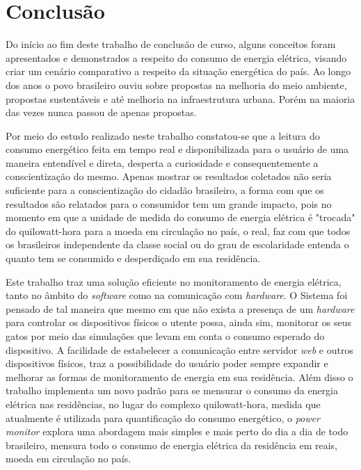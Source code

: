 \chapter[Conclusão]{Conclusão}
\label{ch:conclusao-cap}

Do início ao fim deste trabalho de conclusão de curso, alguns conceitos foram apresentados
e demonstrados a respeito do consumo de energia elétrica, visando criar um cenário
comparativo a respeito da situação energética do país. Ao longo dos anos o povo brasileiro
ouviu sobre propostas na melhoria do meio ambiente, propostas sustentáveis e até
melhoria na infraestrutura urbana. Porém na maioria das vezes nunca passou de apenas propostas.

Por meio do estudo realizado neste trabalho constatou-se que a leitura do
consumo energético feita em tempo real e disponibilizada para o usuário de uma maneira entendível e direta, 
desperta a curiosidade e consequentemente a conscientização do mesmo. Apenas mostrar os resultados coletados não seria suficiente
para a conscientização do cidadão brasileiro, a forma com que os resultados são relatados para o consumidor tem um grande impacto, pois
no momento em que a unidade de medida do consumo de energia elétrica é "trocada" do quilowatt-hora para a moeda em circulação no país, o real, 
faz com que todos os brasileiros independente da classe social ou do grau de escolaridade entenda o quanto tem se consumido e desperdiçado em sua residência.

Este trabalho traz uma solução eficiente no monitoramento de energia elétrica, tanto no âmbito do \textit{software} como na comunicação com 
\textit{hardware}. O Sistema foi pensado de tal maneira que mesmo em que não exista a presença de um \textit{hardware} para controlar os dispositivos físicos
o utente possa, ainda sim, monitorar os seus gatos por meio das simulações que levam em conta o consumo esperado do dispositivo. A facilidade de estabelecer 
a comunicação entre servidor \textit{web} e outros dispositivos físicos, traz a possibilidade do usuário poder sempre expandir e melhorar as formas
de monitoramento de energia em sua residência. Além disso o trabalho implementa um novo padrão para se mensurar o consumo da energia elétrica nas
residências, no lugar do complexo quilowatt-hora, medida que atualmente é utilizada para quantificação do consumo energético, o \textit{power monitor}
explora uma abordagem mais simples e mais perto do dia a dia de todo brasileiro, mensura todo o consumo de energia elétrica da residência em 
reais, moeda em circulação no país. 

